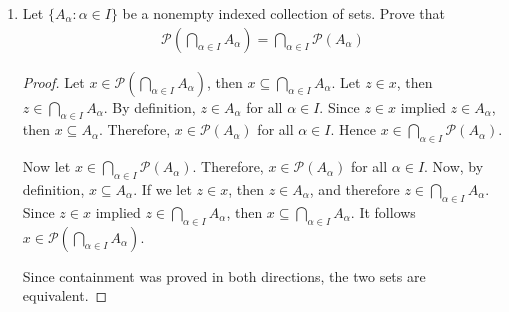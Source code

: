 \documentclass[12pt]{article}
\begin{document}
\begin{enumerate}
\begin{proof}
			Now we can show (2) by counter example. If $A=\{1\}$ and $B=\{2\}$, then $\mathscr{P}(A)\cup\mathscr{P}(B)=\{\emptyset, \{1\}, \{2\} \}$ and $\mathscr{P}(A\cup B)=\{\emptyset, \{1\}, \{2\}, \{1,2\} \}$. This shows the two sets are not equivalent.
		\end{proof}
	
		\item Let $\{A_\alpha:\alpha\in I \}$ be a nonempty indexed collection of sets. Prove that
		\begin{align*}
			\mathscr{P}\left(\bigcap_{\alpha\in I}A_\alpha\right)=\bigcap_{\alpha\in I}\mathscr{P}(A_\alpha)
		\end{align*}
		\begin{proof}
			Let $x\in \mathscr{P}(\bigcap_{\alpha\in I}A_\alpha)$, then $x\subseteq \bigcap_{\alpha\in I}A_\alpha$. Let $z\in x$, then $z\in \bigcap_{\alpha\in I}A_\alpha$. By definition, $z\in A_\alpha$ for all $\alpha\in I$. Since $z\in x$ implied $z\in A_\alpha$, then $x\subseteq A_\alpha$. Therefore, $x\in \mathscr{P}(A_\alpha)$ for all $\alpha\in I$. Hence $x\in \bigcap_{\alpha\in I}\mathscr{P}(A_\alpha)$.
			
			Now let $x\in \bigcap_{\alpha\in I}\mathscr{P}(A_\alpha)$. Therefore, $x\in \mathscr{P}(A_\alpha)$ for all $\alpha\in I$. Now, by definition, $x\subseteq A_\alpha$. If we let $z\in x$, then $z\in A_\alpha$, and therefore $z\in \bigcap_{\alpha\in I}A_\alpha$. Since $z\in x$ implied $z\in \bigcap_{\alpha\in I}A_\alpha$, then $x\subseteq \bigcap_{\alpha\in I}A_\alpha$. It follows $x\in \mathscr{P}(\bigcap_{\alpha\in I}A_\alpha)$.
			
			Since containment was proved in both directions, the two sets are equivalent.
		\end{proof}
	\end{enumerate}
	
\end{document}
